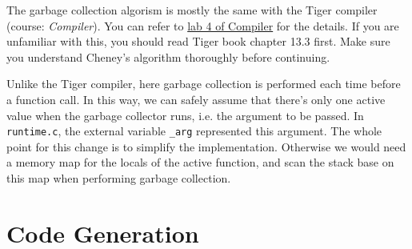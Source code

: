 \documentclass{article}
\theoremstyle{definition}
\theoremstyle{remark}
\numberwithin{equation}{section}
\begin{document}
The garbage collection algorism is mostly the same with the Tiger compiler (course:
\textit{Compiler}). You can refer to
\href{http://staff.ustc.edu.cn/~bjhua/courses/compiler/2014/labs/lab4/index.html}
{lab 4 of Compiler} for the details. If you are unfamiliar with this,
you should read Tiger book chapter 13.3 first.
 Make sure you understand Cheney's algorithm thoroughly before continuing.

Unlike the Tiger compiler, here garbage collection is performed each time
  before a function call. In this way, we can safely assume that there's only
  one active value when the garbage collector runs, i.e. the argument to be
  passed. In \texttt{runtime.c}, the external variable \texttt{\_arg} represented
  this argument. The whole point for this change is to simplify the
  implementation. Otherwise we would need a memory map for the locals of the
  active function, and scan the stack base on this map when performing garbage
  collection.


\section{Code Generation}
\end{document}

